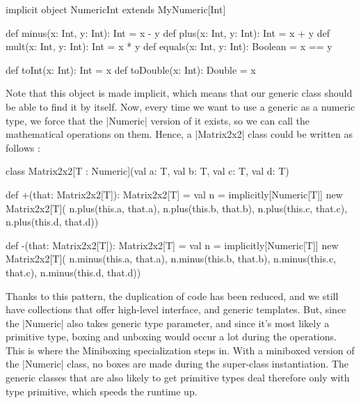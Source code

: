 \begin{lstlisting-nobreak}
 implicit object NumericInt extends MyNumeric[Int] {
   def minus(x: Int, y: Int): Int = x - y
   def plus(x: Int, y: Int): Int = x + y
   def mult(x: Int, y: Int): Int = x * y
   def equals(x: Int, y: Int): Boolean = x == y

   def toInt(x: Int): Int = x
   def toDouble(x: Int): Double = x
 }
\end{lstlisting-nobreak}

Note that this object is made implicit, which means that our generic class should be able to find it by itself. Now, every time we want to use a generic as a numeric type, we force that the |Numeric| version of it exists, so we can call the mathematical operations on them. Hence, a |Matrix2x2| class could be written as follows :

\begin{lstlisting-nobreak}
 class Matrix2x2[T : Numeric](val a: T, val b: T, val c: T, val d: T) {

   def +(that: Matrix2x2[T]): Matrix2x2[T] = {
     val n = implicitly[Numeric[T]]
     new Matrix2x2[T](
       n.plus(this.a, that.a),
       n.plus(this.b, that.b),
       n.plus(this.c, that.c),
       n.plus(this.d, that.d))
   }

   def -(that: Matrix2x2[T]): Matrix2x2[T] = {
     val n = implicitly[Numeric[T]]
     new Matrix2x2[T](
       n.minus(this.a, that.a),
       n.minus(this.b, that.b),
       n.minus(this.c, that.c),
       n.minus(this.d, that.d))
   }
 }
\end{lstlisting-nobreak}
%

Thanks to this pattern, the duplication of code has been reduced, and we still have collections that offer high-level interface, and generic templates. But, since the |Numeric| also takes generic type parameter, and since it's most likely a primitive type, boxing and unboxing would occur a lot during the operations. This is where the Miniboxing specialization steps in. With a miniboxed version of the |Numeric| class, no boxes are made during the super-class instantiation. The generic classes that are also likely to get primitive types deal therefore only with type primitive, which speeds the runtime up.